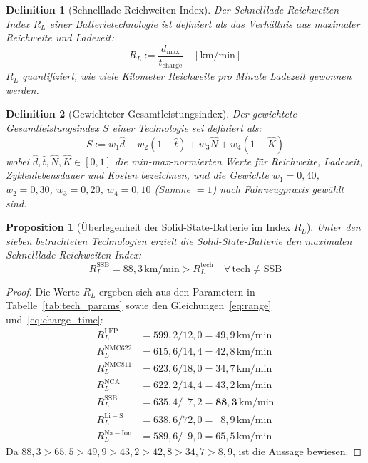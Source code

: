 ﻿\documentclass[12pt,a4paper]{article}
\newtheorem{proposition}[theorem]{Proposition}
\newtheorem{definition}{Definition}[section]
\begin{document}
	\begin{definition}[Schnelllade-Reichweiten-Index]
		Der \emph{Schnelllade-Reichweiten-Index} $R_L$ einer Batterietechnologie
		ist definiert als das Verhältnis aus maximaler Reichweite und
		Ladezeit:
		\begin{equation}
			R_L := \frac{d_{\mathrm{max}}}{t_{\mathrm{charge}}}
			\quad [\mathrm{km/min}]
			\label{eq:rl_index}
		\end{equation}
		$R_L$ quantifiziert, wie viele Kilometer Reichweite pro Minute
		Ladezeit gewonnen werden.
	\end{definition}

	\begin{definition}[Gewichteter Gesamtleistungsindex]
		Der \emph{gewichtete Gesamtleistungsindex} $S$ einer Technologie
		sei definiert als:
		\begin{equation}
			S := w_1 \hat{d} + w_2 (1-\hat{t}) + w_3 \hat{N} + w_4 (1-\hat{K})
			\label{eq:total_score}
		\end{equation}
		wobei $\hat{d}, \hat{t}, \hat{N}, \hat{K} \in [0,1]$ die
		min-max-normierten Werte für Reichweite, Ladezeit, Zyklenlebensdauer
		und Kosten bezeichnen, und die Gewichte
		$w_1=0{,}40$, $w_2=0{,}30$, $w_3=0{,}20$, $w_4=0{,}10$
		(Summe $= 1$) nach Fahrzeugpraxis gewählt sind.
	\end{definition}

	\begin{proposition}[Überlegenheit der Solid-State-Batterie im Index $R_L$]
		\label{prop:ssbrl}
		Unter den sieben betrachteten Technologien erzielt die
		Solid-State-Batterie den maximalen Schnelllade-Reichweiten-Index:
		\begin{equation}
			R_L^{\mathrm{SSB}} = 88{,}3\,\mathrm{km/min} >
			R_L^{\mathrm{tech}} \quad \forall\, \mathrm{tech} \neq \mathrm{SSB}
		\end{equation}
	\end{proposition}

	\begin{proof}
		Die Werte $R_L$ ergeben sich aus den Parametern in
		Tabelle~\ref{tab:tech_params} sowie den
		Gleichungen~\eqref{eq:range} und~\eqref{eq:charge_time}:
		\begin{align*}
			R_L^{\mathrm{LFP}}   &= 599{,}2 / 12{,}0 = 49{,}9\,\mathrm{km/min} \\
			R_L^{\mathrm{NMC622}}&= 615{,}6 / 14{,}4 = 42{,}8\,\mathrm{km/min} \\
			R_L^{\mathrm{NMC811}}&= 623{,}6 / 18{,}0 = 34{,}7\,\mathrm{km/min} \\
			R_L^{\mathrm{NCA}}   &= 622{,}2 / 14{,}4 = 43{,}2\,\mathrm{km/min} \\
			R_L^{\mathrm{SSB}}   &= 635{,}4 / \phantom{0}7{,}2 = \mathbf{88{,}3}\,\mathrm{km/min} \\
			R_L^{\mathrm{Li-S}}  &= 638{,}6 / 72{,}0 = \phantom{0}8{,}9\,\mathrm{km/min} \\
			R_L^{\mathrm{Na-Ion}}&= 589{,}6 / \phantom{0}9{,}0 = 65{,}5\,\mathrm{km/min}
		\end{align*}
		Da $88{,}3 > 65{,}5 > 49{,}9 > 43{,}2 > 42{,}8 > 34{,}7 > 8{,}9$,
		ist die Aussage bewiesen.
	\end{proof}
\end{document}
